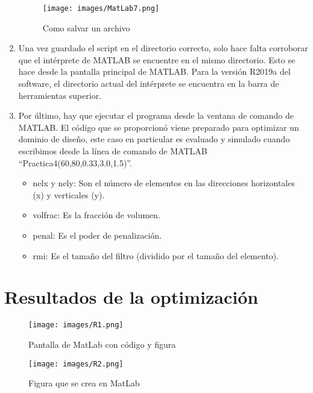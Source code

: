 \documentclass{article}
\begin{document}
\begin{enumerate}
\begin{figure}[h] %
    \centering
    \texttt{[image: images/MatLab7.png]} %
    \caption{Como salvar un archivo}
\end{figure}


\item   Una vez guardado el script en el directorio correcto, solo hace falta corroborar que el intérprete de MATLAB se encuentre en el mismo directorio. Esto se hace desde la pantalla principal de MATLAB. Para la versión R2019a del software, el directorio actual del intérprete se encuentra en la barra de herramientas superior.



\item   Por último, hay que ejecutar el programa desde la ventana de comando de MATLAB. El código que se proporcionó viene preparado para optimizar un dominio de diseño, este caso en particular es evaluado y simulado cuando escribimos desde la línea de comando de MATLAB “Practica4(60,80,0.33,3.0,1.5)”.
\begin{itemize}
  \item nelx y nely: Son el número de elementos en las direcciones horizontales (x) y verticales (y). 
   \item	volfrac: Es la fracción de volumen. 
   \item	penal: Es el poder de penalización. 
   \item	rmi: Es el tamaño del filtro (dividido por el tamaño del elemento).
\end{itemize}

\end{enumerate}


\section{Resultados de la optimización}

\begin{figure}[h] %
    \centering
    \texttt{[image: images/R1.png]} %
    \caption{Pantalla de MatLab con c\'{o}digo y figura}
\end{figure}



\begin{figure}[h] %
    \centering
    \texttt{[image: images/R2.png]} %
    \caption{Figura que se crea en MatLab}
\end{figure}
\end{document}
